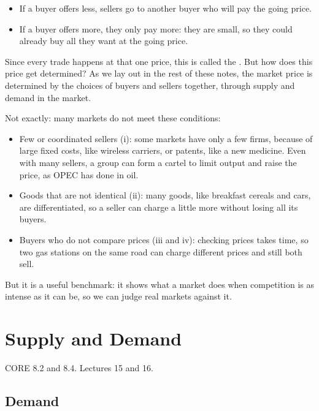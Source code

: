 \documentclass[11pt]{article}
\newcommand{\secinfo}[1]{{\small\color{muted}#1\par}\vspace{2pt}}
\begin{document}
\begin{itemize}
\item If a buyer offers less, sellers go to another buyer who will pay the going price.
\item If a buyer offers more, they only pay more: they are small, so they could already buy all they want at the going price.
\end{itemize}

Since every trade happens at that one price, this is called the . But how does this price get determined? As we lay out in the rest of these notes, the market price is determined by the choices of buyers and sellers together, through supply and demand in the market.

 Not exactly: many markets do not meet these conditions:
\begin{itemize}
\item Few or coordinated sellers (i): some markets have only a few firms, because of large fixed costs, like wireless carriers, or patents, like a new medicine. Even with many sellers, a group can form a cartel to limit output and raise the price, as OPEC has done in oil.
\item Goods that are not identical (ii): many goods, like breakfast cereals and cars, are differentiated, so a seller can charge a little more without losing all its buyers.
\item Buyers who do not compare prices (iii and iv): checking prices takes time, so two gas stations on the same road can charge different prices and still both sell.
\end{itemize}
But it is a useful benchmark: it shows what a market does when competition is as intense as it can be, so we can judge real markets against it.

\section{Supply and Demand}
\secinfo{CORE 8.2 and 8.4. Lectures 15 and 16.}

\subsection{Demand}
\end{document}
